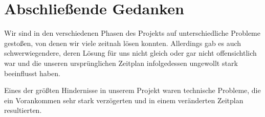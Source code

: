\documentclass{Bericht}
\begin{document}


\section{Abschließende Gedanken} %
	Wir sind in den verschiedenen Phasen des Projekts auf unterschiedliche Probleme gestoßen, von denen wir viele zeitnah lösen konnten. Allerdings gab es auch schwerwiegendere, deren Lösung für uns nicht gleich oder gar nicht offensichtlich war und die unseren ursprünglichen Zeitplan infolgedessen ungewollt stark beeinflusst haben.
	
	Eines der größten Hindernisse in unserem Projekt waren technische Probleme, die ein Vorankommen sehr stark verzögerten und in einem veränderten Zeitplan resultierten.
	
\end{document}
